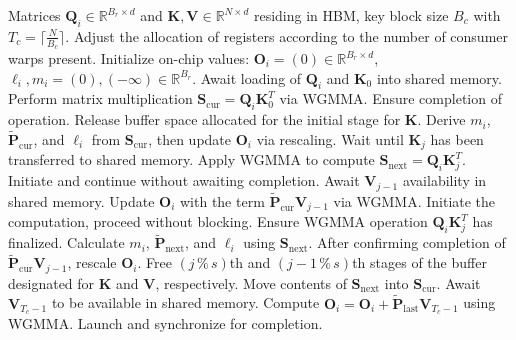 \begin{enumerate}
\begin{algorithm}[H]
    \caption{\small\label{alg:flash3_wgmma}\textsc{FlashAttention-3} consumer warpgroup forward pass}
    \begin{algorithmic}[1]
      \REQUIRE  Matrices $\mathbf{Q}_i \in \mathbb{R}^{B_r \times d}$ and $\mathbf{K}, \mathbf{V} \in \mathbb{R}^{N \times d}$ residing in HBM, key block size $B_c$ with $T_c = \lceil \frac{N}{B_c} \rceil$.
      \STATE Adjust the allocation of registers according to the number of consumer warps present.
      \STATE Initialize on-chip values: $\mathbf{O}_i = (0) \in \mathbb{R}^{B_r \times d}$, $\ell_i, m_i = (0), (-\infty) \in \mathbb{R}^{B_r}$.
      \STATE Await loading of $\mathbf{Q}_i$ and $\mathbf{K}_0$ into shared memory.
      \STATE Perform matrix multiplication $\mathbf{S}_{\mathrm{cur}} = \mathbf{Q}_i \mathbf{K}_0^T$ via WGMMA. Ensure completion of operation.
      \STATE Release buffer space allocated for the initial stage for $\mathbf{K}$.
      \STATE Derive $m_{i}$, $\tilde{\mathbf{P}}_{\mathrm{cur}}$, and $\ell_{i}$ from $\mathbf{S}_{\mathrm{cur}}$, then update $\mathbf{O}_i$ via rescaling.
        \STATE Wait until $\mathbf{K}_j$ has been transferred to shared memory.
        \label{code:mainloop_start}
        \STATE Apply WGMMA to compute $\mathbf{S}_{\mathrm{next}} = \mathbf{Q}_i \mathbf{K}_{j}^T$. Initiate and continue without awaiting completion. \label{code:first_wgmma}
        \STATE Await $\mathbf{V}_{j-1}$ availability in shared memory.
        \STATE Update $\mathbf{O}_{i}$ with the term $\tilde{\mathbf{P}}_{\mathrm{cur}} \mathbf{V}_{j-1}$ via WGMMA. Initiate the computation, proceed without blocking. \label{code:second_wgmma}
        \STATE Ensure WGMMA operation $\mathbf{Q}_i \mathbf{K}_{j}^T$ has finalized.
        \STATE Calculate $m_{i}$, $\tilde{\mathbf{P}}_{\mathrm{next}}$, and $\ell_{i}$ using $\mathbf{S}_{\mathrm{next}}$. \label{code:softmax}
        \STATE After confirming completion of $\tilde{\mathbf{P}}_{\mathrm{cur}} \mathbf{V}_{j-1}$, rescale $\mathbf{O}_i$.
        \STATE Free $(j\,\%\,s)$th and $(j-1\,\%\,s)$th stages of the buffer designated for $\mathbf{K}$ and $\mathbf{V}$, respectively.
        \STATE Move contents of $\mathbf{S}_{\mathrm{next}}$ into $\mathbf{S}_{\mathrm{cur}}$.
        \label{code:mainloop_end}
      \ENDFOR \STATE Await $\mathbf{V}_{T_c - 1}$ to be available in shared memory.
      \STATE Compute
      $\mathbf{O}_{i} = \mathbf{O}_{i} + \tilde{\mathbf{P}}_{\mathrm{last}} \mathbf{V}_{T_c - 1}$ using WGMMA. Launch and synchronize for completion.


\end{algorithmic}
\end{algorithm}
\end{enumerate}
